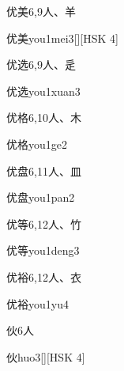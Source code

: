 \begin{entry}{优美}{6,9}{⼈、⽺}
  \begin{phonetics}{优美}{you1mei3}[][HSK 4]
  \end{phonetics}
\end{entry}

\begin{entry}{优选}{6,9}{⼈、⾡}
  \begin{phonetics}{优选}{you1xuan3}
  \end{phonetics}
\end{entry}

\begin{entry}{优格}{6,10}{⼈、⽊}
  \begin{phonetics}{优格}{you1ge2}
  \end{phonetics}
\end{entry}

\begin{entry}{优盘}{6,11}{⼈、⽫}
  \begin{phonetics}{优盘}{you1pan2}
  \end{phonetics}
\end{entry}

\begin{entry}{优等}{6,12}{⼈、⽵}
  \begin{phonetics}{优等}{you1deng3}
  \end{phonetics}
\end{entry}

\begin{entry}{优裕}{6,12}{⼈、⾐}
  \begin{phonetics}{优裕}{you1yu4}
  \end{phonetics}
\end{entry}

\begin{entry}{伙}{6}{⼈}
  \begin{phonetics}{伙}{huo3}[][HSK 4]
  \end{phonetics}
\end{entry}

